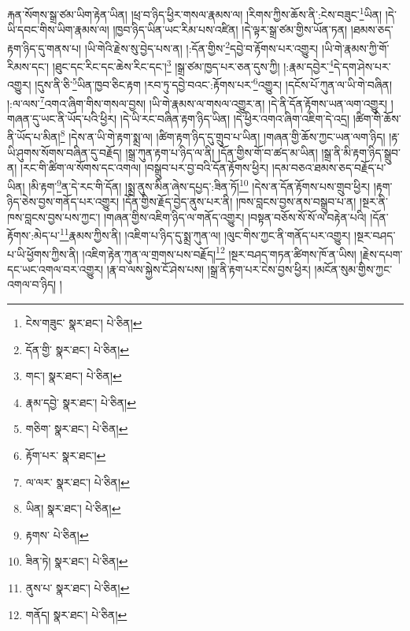 རྐན་སོགས་སྒྲ་ཙམ་ཡིག་རྟེན་ཡིན། །ཕྲ་བ་ཉིད་ཕྱིར་གསལ་རྣམས་ལ། །རིགས་ཀྱིས་ཆོས་ནི་:ངེས་བཟུང་\footnote{ངེས་གཟུང་  སྣར་ཐང་།  པེ་ཅིན། }ཡིན། །དེ་ཡི་དབང་གིས་ཡིག་རྣམས་ལ། །ཁྱབ་ཉིད་ཡིན་ཡང་རིམ་པས་འཛིན། །དེ་ལྟར་སྒྲ་ཙམ་གྱིས་ཡོན་ཏན། །ཐམས་ཅད་རྟག་ཉིད་དུ་གནས་པ། །ཡི་གེའི་རྗེས་སུ་བྱེད་པས་ན། །:དོན་གྱིས་\footnote{དོན་གྱི་  སྣར་ཐང་།  པེ་ཅིན། }དབྱེ་བ་རྟོགས་པར་འགྱུར། །ཡི་གེ་རྣམས་ཀྱི་གོ་རིམས་དང་། །ཐུང་དང་རིང་དང་ཆེས་རིང་དང་།\footnote{གང་།  སྣར་ཐང་།  པེ་ཅིན། } །སྒྲ་ཙམ་ཁྱད་པར་ཅན་དུས་ཀྱི། །:རྣམ་དབྱེར་\footnote{རྣམ་དབྱེ་  སྣར་ཐང་།  པེ་ཅིན། }དེ་དག་ཤེས་པར་འགྱུར། །དུས་ནི་ཅི་\footnote{གཅིག་  སྣར་ཐང་།  པེ་ཅིན། }ཡིན་ཁྱབ་ཅིང་རྟག །རབ་ཏུ་དབྱེ་བའང་:རྟོགས་པར་\footnote{རྟོག་པར་  སྣར་ཐང་། }འགྱུར། །དངོས་པོ་ཀུན་ལ་ཡི་གེ་བཞིན། །:ལ་ལས་\footnote{ལ་ལར་  སྣར་ཐང་།  པེ་ཅིན། }འགའ་ཞིག་གིས་གསལ་བྱས། །ཡི་གེ་རྣམས་ལ་གསལ་འགྱུར་ན། །དེ་ནི་དོན་རྟོགས་ཡན་ལག་འགྱུར། །གཞན་དུ་ཡང་ནི་ཡོད་པའི་ཕྱིར། །དེ་ཡི་རང་བཞིན་རྟག་ཉིད་ཡིན། །དེ་ཕྱིར་འགའ་ཞིག་འཇིག་དེ་འདྲ། །ཚིག་གི་ཆོས་ནི་ཡོད་པ་མིན།\footnote{ཡིན།  སྣར་ཐང་།  པེ་ཅིན། } །དེས་ན་ཡི་གེ་རྟག་སྨྲ་ལ། །ཚིག་རྟག་ཉིད་དུ་གྲུབ་པ་ཡིན། །གཞན་གྱི་ཆོས་ཀྱང་ཡན་ལག་ཉིད། །རྟ་ཡི་ཤུགས་སོགས་བཞིན་དུ་བརྗོད། །སྒྲ་ཀུན་རྟག་པ་ཉིད་ལ་ནི། །དོན་གྱིས་གོ་བ་ཚད་མ་ཡིན། །སྒྲ་ནི་མི་རྟག་ཉིད་སྒྲུབ་ན། །རང་གི་ཚིག་ལ་སོགས་དང་འགལ། །བསྒྲུབ་པར་བྱ་བའི་དོན་རྟོགས་ཕྱིར། །དམ་བཅའ་ཐམས་ཅད་བརྗོད་པ་ཡིན། །མི་རྟག་\footnote{རྟགས་  པེ་ཅིན། }ན་དེ་རང་གི་དོན། །སྨྲ་ནུས་མིན་ཞེས་དཔྱད་:ཟིན་ཏོ།\footnote{ཟིན་ཏེ།  སྣར་ཐང་།  པེ་ཅིན། } །དེས་ན་དོན་རྟོགས་པས་གྲུབ་ཕྱིར། །རྟག་ཉིད་ཅེས་བྱས་གནོད་པར་འགྱུར། །དོན་གྱིས་རྗོད་བྱེད་ནུས་པར་ནི། །ཁས་བླངས་བྱས་ནས་བསྒྲུབ་པ་ན། །སྔར་ནི་ཁས་བླངས་བྱས་པས་ཀྱང་། །གཞན་གྱིས་འཇིག་ཉིད་ལ་གནོད་འགྱུར། །བསྟན་བཅོས་སོ་སོ་ལ་བརྟེན་པའི། །དོན་རྟོགས་:མེད་པ་\footnote{ནུས་པ་  སྣར་ཐང་།  པེ་ཅིན། }རྣམས་ཀྱིས་ནི། །འཇིག་པ་ཉིད་དུ་སྨྲ་ཀུན་ལ། །ལུང་གིས་ཀྱང་ནི་གནོད་པར་འགྱུར། །སྔར་བཤད་པ་ཡི་ཕྱོགས་ཀྱིས་ནི། །འཇིག་རྟེན་ཀུན་ལ་གྲགས་པས་བརྗོད།\footnote{གནོད།  སྣར་ཐང་།  པེ་ཅིན། } །སྔར་བཤད་གཏན་ཚིགས་ཁོ་ན་ཡིས། །རྗེས་དཔག་དང་ཡང་འགལ་བར་འགྱུར། །རྣ་བ་ལས་སྐྱེས་ངོ་ཤེས་པས། །སྒྲ་ནི་རྟག་པར་ངེས་བྱས་ཕྱིར། །མངོན་སུམ་གྱིས་ཀྱང་འགལ་བ་ཉིད། །
